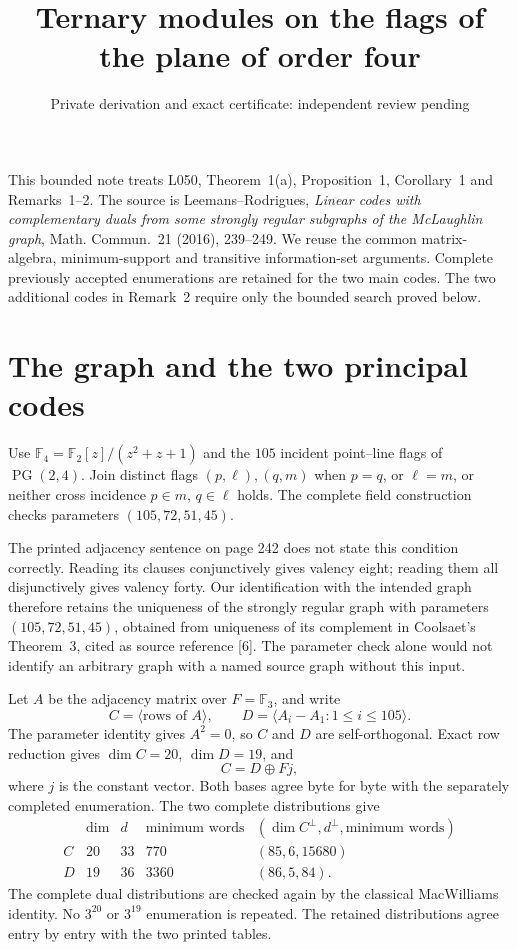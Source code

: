 \documentclass[11pt,a4paper]{article}
\title{Ternary modules on the flags of the plane of order four}
\author{Private derivation and exact certificate: independent review pending}
\date{}
\begin{document}
\maketitle

This bounded note treats L050, Theorem~1(a), Proposition~1,
Corollary~1 and Remarks~1--2. The source is Leemans--Rodrigues,
\emph{Linear codes with complementary duals from some strongly regular
subgraphs of the McLaughlin graph}, Math. Commun.\ 21 (2016), 239--249.
We reuse the common matrix-algebra, minimum-support and transitive
information-set arguments. Complete previously accepted enumerations
are retained for the two main codes. The two additional codes in
Remark~2 require only the bounded search proved below.

\section{The graph and the two principal codes}
Use $\mathbb F_4=\mathbb F_2[z]/(z^2+z+1)$ and the $105$ incident
point--line flags of $\operatorname{PG}(2,4)$. Join distinct flags
$(p,\ell),(q,m)$ when $p=q$, or $\ell=m$, or neither cross incidence
$p\in m$, $q\in\ell$ holds. The complete field construction checks
parameters $(105,72,51,45)$.

The printed adjacency sentence on page 242 does not state this condition
correctly. Reading its clauses conjunctively gives valency eight;
reading them all disjunctively gives valency forty. Our identification
with the intended graph therefore retains the uniqueness of the strongly
regular graph with parameters $(105,72,51,45)$, obtained from uniqueness
of its complement in Coolsaet's Theorem~3, cited as source reference [6].
The parameter check alone would not identify an arbitrary graph with a
named source graph without this input.

Let $A$ be the adjacency matrix over $F=\mathbb F_3$, and write
\[
 C=\langle\text{rows of }A\rangle,
 \qquad D=\langle A_i-A_1:1\leq i\leq105\rangle.
\]
The parameter identity gives $A^2=0$, so $C$ and $D$ are self-orthogonal.
Exact row reduction gives $\dim C=20$, $\dim D=19$, and
\[
 C=D\oplus Fj,                                      \tag{1}
\]
where $j$ is the constant vector. Both bases agree byte for byte with the
separately completed enumeration. The two complete distributions give
\[
\begin{array}{c|rrrr}
 &\dim&d&\text{minimum words}&(\dim C^\perp,d^\perp,\text{minimum words})\\\hline
 C&20&33&770&(85,6,15680)\\
 D&19&36&3360&(86,5,84).
\end{array}
\]
The complete dual distributions are checked again by the classical
MacWilliams identity. No $3^{20}$ or $3^{19}$ enumeration is repeated.
The retained distributions agree entry by entry with the two printed
tables.
\end{document}
